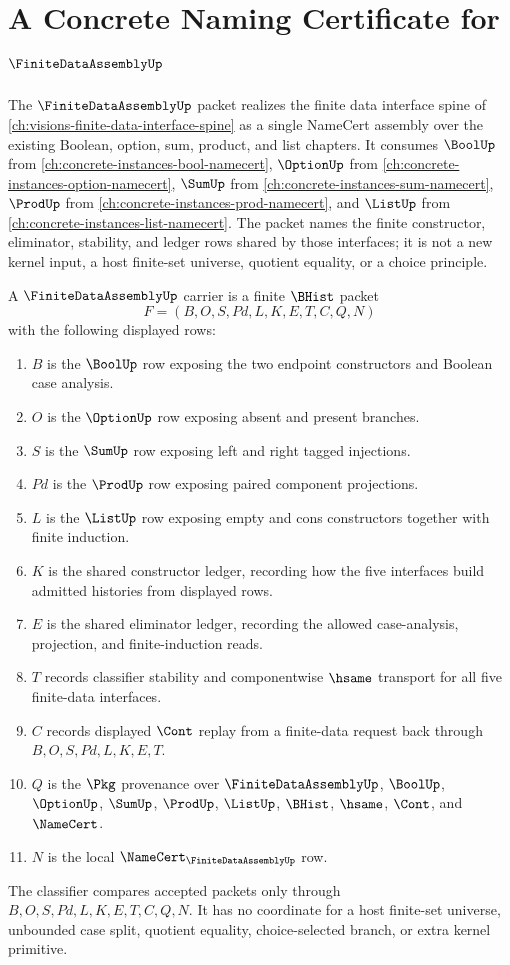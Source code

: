 \chapter{A Concrete Naming Certificate for $\FiniteDataAssemblyUp$}
\label{ch:concrete-instances-finite-data-assembly-namecert}

The $\FiniteDataAssemblyUp$ packet realizes the finite data interface spine of \autoref{ch:visions-finite-data-interface-spine} as a single NameCert assembly over the existing Boolean, option, sum, product, and list chapters. It consumes $\BoolUp$ from \autoref{ch:concrete-instances-bool-namecert}, $\OptionUp$ from \autoref{ch:concrete-instances-option-namecert}, $\SumUp$ from \autoref{ch:concrete-instances-sum-namecert}, $\ProdUp$ from \autoref{ch:concrete-instances-prod-namecert}, and $\ListUp$ from \autoref{ch:concrete-instances-list-namecert}. The packet names the finite constructor, eliminator, stability, and ledger rows shared by those interfaces; it is not a new kernel input, a host finite-set universe, quotient equality, or a choice principle.

\begin{definition}
\label{def:finite-data-assembly-carrier}
A $\FiniteDataAssemblyUp$ carrier is a finite $\BHist$ packet
$$
F=(B,O,S,Pd,L,K,E,T,C,Q,N)
$$
with the following displayed rows:
\begin{enumerate}
\item $B$ is the $\BoolUp$ row exposing the two endpoint constructors and Boolean case analysis.
\item $O$ is the $\OptionUp$ row exposing absent and present branches.
\item $S$ is the $\SumUp$ row exposing left and right tagged injections.
\item $Pd$ is the $\ProdUp$ row exposing paired component projections.
\item $L$ is the $\ListUp$ row exposing empty and cons constructors together with finite induction.
\item $K$ is the shared constructor ledger, recording how the five interfaces build admitted histories from displayed rows.
\item $E$ is the shared eliminator ledger, recording the allowed case-analysis, projection, and finite-induction reads.
\item $T$ records classifier stability and componentwise $\hsame$ transport for all five finite-data interfaces.
\item $C$ records displayed $\Cont$ replay from a finite-data request back through $B,O,S,Pd,L,K,E,T$.
\item $Q$ is the $\Pkg$ provenance over $\FiniteDataAssemblyUp$, $\BoolUp$, $\OptionUp$, $\SumUp$, $\ProdUp$, $\ListUp$, $\BHist$, $\hsame$, $\Cont$, and $\NameCert$.
\item $N$ is the local $\NameCert_{\FiniteDataAssemblyUp}$ row.
\end{enumerate}
The classifier compares accepted packets only through $B,O,S,Pd,L,K,E,T,C,Q,N$. It has no coordinate for a host finite-set universe, unbounded case split, quotient equality, choice-selected branch, or extra kernel primitive.
\end{definition}

